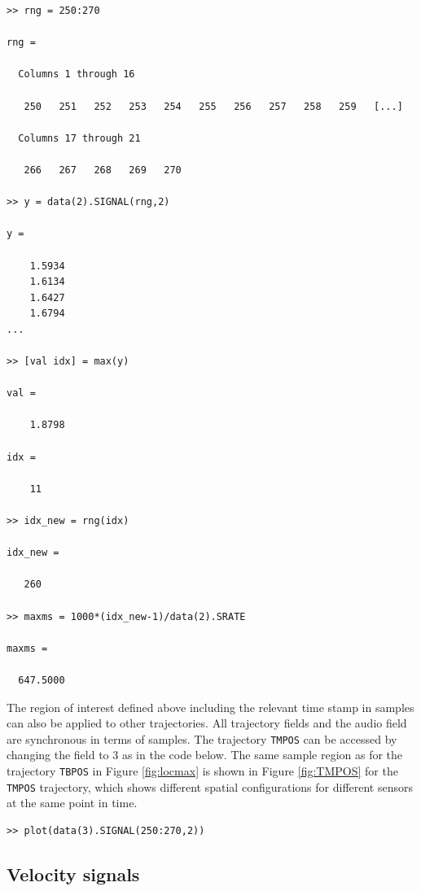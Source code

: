 \documentclass[a4paper, 12pt]{article}
\begin{document}
\begin{verbatim}
>> rng = 250:270

rng =

  Columns 1 through 16

   250   251   252   253   254   255   256   257   258   259   [...]

  Columns 17 through 21

   266   267   268   269   270
   
>> y = data(2).SIGNAL(rng,2)

y =

    1.5934
    1.6134
    1.6427
    1.6794
...

>> [val idx] = max(y)

val =

    1.8798

idx =

    11

>> idx_new = rng(idx)

idx_new =

   260

>> maxms = 1000*(idx_new-1)/data(2).SRATE

maxms =

  647.5000
\end{verbatim}

The region of interest defined above including the relevant time stamp in samples can also be applied to other trajectories. All trajectory fields and the audio field are synchronous in terms of samples. The trajectory \texttt{TMPOS} can be accessed by changing the field to 3 as in the code below. The same sample region as for the trajectory \texttt{TBPOS} in Figure \ref{fig:locmax} is shown in Figure \ref{fig:TMPOS} for the \texttt{TMPOS} trajectory, which shows different spatial configurations for different sensors at the same point in time.


\begin{verbatim}
>> plot(data(3).SIGNAL(250:270,2))
\end{verbatim}

\subsection{Velocity signals}\label{velsign}
\end{document}
